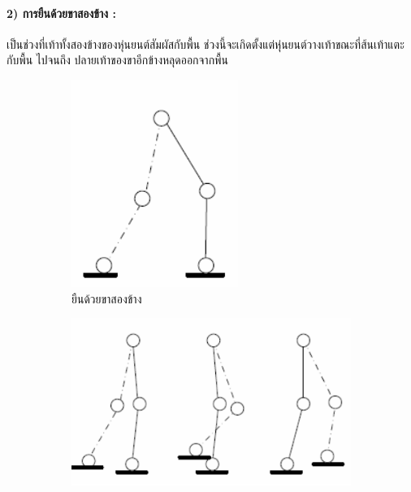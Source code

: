 \paragraph*{2) การยืนด้วยขาสองข้าง :}
เป็นช่วงที่เท้าทั้งสองข้างของหุ่นยนต์สัมผัสกับพื้น ช่วงนี้จะเกิดตั้งแต่หุ่นยนต์วางเท้าขณะที่ส้นเท้าแตะกับพื้น
ไปจนถึง ปลายเท้าของขาอีกข้างหลุดออกจากพื้น

\begin{figure}[htbp]
	\centering
	\begin{subfigure}[b]{0.22\textwidth}
		\centering
		\includegraphics[width=\textwidth]{chapter2/images/doublesupport.png}
		\caption{ยืนด้วยขาสองข้าง}
		\label{fig:robot_walk_1}
	\end{subfigure}
	\hfill
	\begin{subfigure}[b]{0.45\textwidth}
		\centering
		\includegraphics[width=\textwidth]{chapter2/images/singlesupport.png}

\end{subfigure}
\end{figure}
